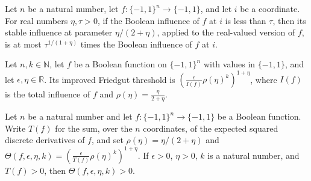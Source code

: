 \begin{theorem}
\label{FABL.stableInfluence_improvedFriedgutRho_le}
\leanok
{}
Let $n$ be a natural number, let $f:\{−1,1\}^n\to\{−1,1\}$, and let $i$ be a coordinate.
For real numbers $\eta,\tau>0$, if the Boolean influence of $f$ at $i$ is less than
$\tau$, then its stable influence at parameter $\eta/(2+\eta)$, applied to the
real-valued version of $f$, is at most $\tau^{1/(1+\eta)}$ times the Boolean influence
of $f$ at $i$.
\end{theorem}

\begin{definition}
\label{FABL.improvedFriedgutThreshold}
\leanok
{}
Let $n,k\in\mathbb N$, let $f$ be a Boolean function on $\{−1,1\}^n$ with values in
$\{−1,1\}$, and let $\epsilon,\eta\in\mathbb R$. Its improved Friedgut threshold is
$\left(\frac{\epsilon}{I(f)}\rho(\eta)^k\right)^{1+\eta}$, where $I(f)$ is the total
influence of $f$ and $\rho(\eta)=\frac{\eta}{2+\eta}$.
\end{definition}

\begin{theorem}
\label{FABL.improvedFriedgutThreshold_pos}
\leanok
{}
Let $n$ be a natural number and let $f:\{-1,1\}^n\to\{-1,1\}$ be a Boolean function.
Write $T(f)$ for the sum, over the $n$ coordinates, of the expected squared discrete
derivatives of $f$, and set $\rho(\eta)=\eta/(2+\eta)$ and
$\Theta(f,\epsilon,\eta,k)=(\frac{\epsilon}{T(f)}\rho(\eta)^k)^{1+\eta}$. If
$\epsilon>0$, $\eta>0$, $k$ is a natural number, and $T(f)>0$, then
$\Theta(f,\epsilon,\eta,k)>0$.
\end{theorem}

